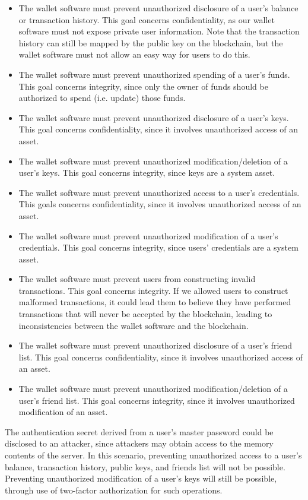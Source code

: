 \documentclass[12pt]{article}
\begin{document}
\begin{itemize}
\item The wallet software must prevent unauthorized disclosure of a user's balance or transaction history. This goal concerns confidentiality, as our wallet software must not expose private user information. Note that the transaction history can still be mapped by the public key on the blockchain, but the wallet software must not allow an easy way for users to do this.
\item The wallet software must prevent unauthorized spending of a user's funds. This goal concerns integrity, since only the owner of funds should be authorized to spend (i.e. update) those funds.
\item The wallet software must prevent unauthorized disclosure of a user's keys. This goal concerns confidentiality, since it involves unauthorized access of an asset.
\item The wallet software must prevent unauthorized modification/deletion of a user's keys. This goal concerns integrity, since keys are a system asset.
\item The wallet software must prevent unauthorized access to a user's credentials. This goals concerns confidentiality, since it involves unauthorized access of an asset.
\item The wallet software must prevent unauthorized modification of a user's credentials. This goal concerns integrity, since users' credentials are a system asset.
\item The wallet software must prevent users from constructing invalid transactions. This goal concerns integrity. If we allowed users to construct malformed transactions, it could lead them to believe they have performed transactions that will never be accepted by the blockchain, leading to inconsistencies between the wallet software and the blockchain.
\item The wallet software must prevent unauthorized disclosure of a user's friend list. This goal concerns confidentiality, since it involves unauthorized access of an asset.
\item The wallet software must prevent unauthorized modification/deletion of a user's friend list. This goal concerns integrity, since it involves unauthorized modification of an asset.
\end{itemize}

The authentication secret derived from a user's master password could be disclosed to an attacker, since attackers may obtain access to the memory contents of the server. In this scenario, preventing unauthorized access to a user's balance, transaction history, public keys, and friends list will not be possible. Preventing unauthorized modification of a user's keys will still be possible, through use of two-factor authorization for such operations.
\end{document}
